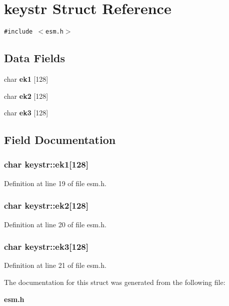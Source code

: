 \section{keystr Struct Reference}
\label{structkeystr}
{\tt \#include $<$esm.h$>$}

\subsection*{Data Fields}
\begin{CompactItemize}
\item 
char {\bf ek1} [128]
\item 
char {\bf ek2} [128]
\item 
char {\bf ek3} [128]
\end{CompactItemize}


\subsection{Field Documentation}
\subsubsection{\setlength{\rightskip}{0pt plus 5cm}char {\bf keystr::ek1}[128]}\label{structkeystr_o0}




Definition at line 19 of file esm.h.
\subsubsection{\setlength{\rightskip}{0pt plus 5cm}char {\bf keystr::ek2}[128]}\label{structkeystr_o1}




Definition at line 20 of file esm.h.
\subsubsection{\setlength{\rightskip}{0pt plus 5cm}char {\bf keystr::ek3}[128]}\label{structkeystr_o2}




Definition at line 21 of file esm.h.

The documentation for this struct was generated from the following file:\begin{CompactItemize}
\item 
{\bf esm.h}\end{CompactItemize}
